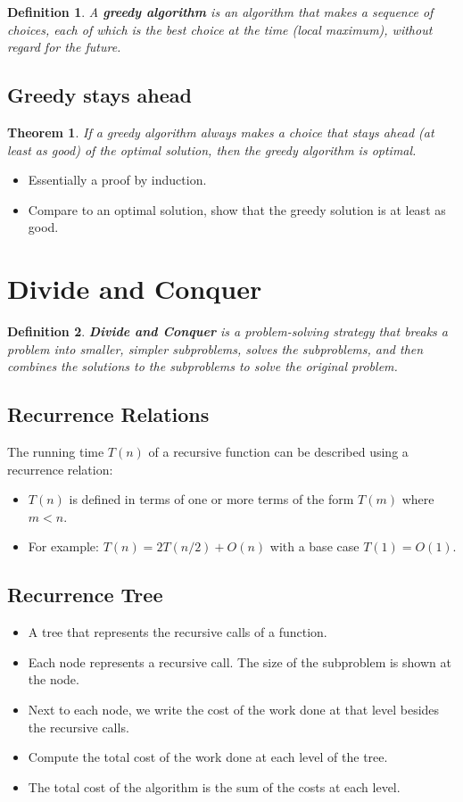 \documentclass[11pt,fleqn]{article}
\newtheorem*{theorem}{Theorem}
\newtheorem*{definition}{Definition}
\begin{document}
\begin{definition}
    A \textbf{greedy algorithm} is an algorithm that makes a sequence of choices, each of which is the best choice at the time (local maximum), without regard for the future.
\end{definition}
\subsection{Greedy stays ahead}
\begin{theorem}
    If a greedy algorithm always makes a choice that stays ahead (at least as good) of the optimal solution, then the greedy algorithm is optimal.
\end{theorem}
\begin{itemize}
    \item Essentially a proof by induction.
    \item Compare to an optimal solution, show that the greedy solution is at least as good.
\end{itemize}

\section{Divide and Conquer}

\begin{definition}
    \textbf{Divide and Conquer} is a problem-solving strategy that breaks a problem into smaller, simpler subproblems, solves the subproblems, and then combines the solutions to the subproblems to solve the original problem.
\end{definition}

\subsection{Recurrence Relations}
The running time $T(n)$ of a recursive function can be described using a recurrence relation:\begin{itemize}
    \item $T(n)$ is defined in terms of one or more terms of the form $T(m)$ where $m < n$.
    \item For example: $T(n) = 2T(n/2) + O(n)$ with a base case $T(1) = O(1)$.
\end{itemize}

\subsection{Recurrence Tree}
\begin{itemize}
    \item A tree that represents the recursive calls of a function.
    \item Each node represents a recursive call. The size of the subproblem is shown at the node.
    \item Next to each node, we write the cost of the work done at that level besides the recursive calls.
    \item Compute the total cost of the work done at each level of the tree.
    \item The total cost of the algorithm is the sum of the costs at each level.
\end{itemize}
\end{document}

